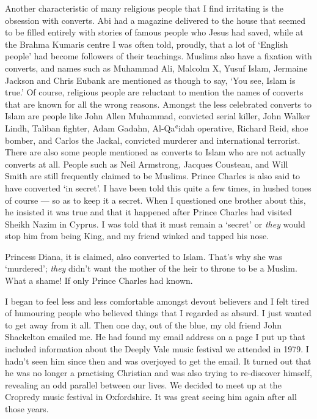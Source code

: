 \documentclass[12pt]{memoir}
\def\`{ʿ} %
\def\–{-\hskip0pt}
\begin{document}
Another characteristic of many religious people
that I find irritating is the obsession with converts.
Abi had a magazine delivered to the house that seemed to be filled entirely
with stories of famous people who Jesus had saved,
while at the Brahma Kumaris centre I was often told, proudly,
that a lot of ‘English people’ had become followers of their teachings.
Muslims also have a fixation with converts, and names such as Muhammad Ali,
Malcolm X, Yusuf Islam, Jermaine Jackson and Chris Eubank
are mentioned as though to say, ‘You see, Islam is true.’
Of course, religious people are reluctant to mention
the names of converts that are known for all the wrong reasons.
Amongst the less celebrated converts to Islam are people
like John Allen Muhammad, convicted serial killer,
John Walker Lindh, Taliban fighter, Adam Gadahn,
Al\–Qa\`idah operative, Richard Reid, shoe bomber,
and Carlos the Jackal, convicted murderer and international terrorist.
There are also some people mentioned as converts to Islam
who are not actually converts at all.
People such as Neil Armstrong, Jacques Cousteau, and Will Smith
are still frequently claimed to be Muslims.
Prince Charles is also said to have converted ‘in secret’.
I have been told this quite a few times, in hushed tones of course —
so as to keep it a secret.
When I questioned one brother about this, he insisted it was true and that
it happened after Prince Charles had visited Sheikh Nazim in Cyprus.
I was told that it must remain a ‘secret’ or \emph{they}
would stop him from being King, and my friend winked and tapped his nose.

Princess Diana, it is claimed, also converted to Islam.
That’s why she was ‘murdered’;
\emph{they} didn’t want the mother of the heir to throne to be a Muslim.
What a shame! If only Prince Charles had known.

I began to feel less and less comfortable amongst devout believers
and I felt tired of humouring people who believed things
that I regarded as absurd.
I just wanted to get away from it all.
Then one day, out of the blue, my old friend John Shackelton emailed me.
He had found my email address on a page I put up that included information
about the Deeply Vale music festival we attended in 1979.
I hadn’t seen him since then and was overjoyed to get the email.
It turned out that he was no longer a practising Christian
and was also trying to re\–discover himself,
revealing an odd parallel between our lives.
We decided to meet up at the Cropredy music festival in Oxfordshire.
It was great seeing him again after all those years.
\end{document}
